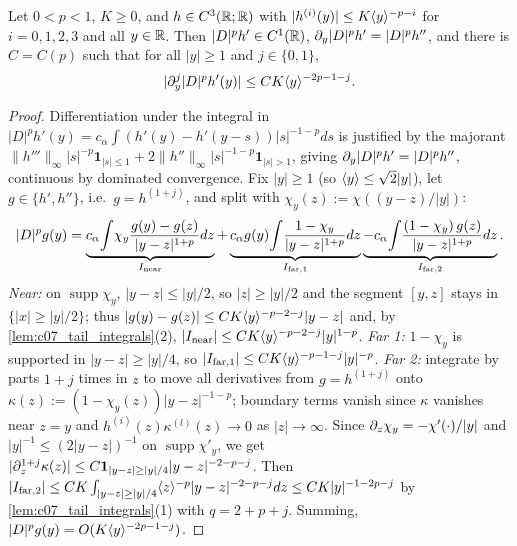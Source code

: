 \begin{lemma}
  \label{lem:c07_fractional_decay}
  Let $0<p<1$, $K\ge0$, and $h\in C^3(\mathbb{R};\mathbb{R})$ with $|h^{(i)}(y)|\le K\langle y \rangle^{-p-i}$ for
  $i=0,1,2,3$ and all $y\in\mathbb{R}$. Then $|D|^ph'\in C^1(\mathbb{R})$, $\partial_y|D|^ph'=|D|^ph''$, and there is
  $C=C(p)$ such that for all $|y|\ge1$ and $j\in\{0,1\}$,
  \[|\partial_y^j|D|^ph'(y)|\le CK\langle y \rangle^{-2p-1-j}.\]
\end{lemma}
\begin{proof}
  Differentiation under the integral in $|D|^ph'(y)=c_\alpha\int(h'(y)-h'(y-s))|s|^{-1-p}ds$ is
  justified by the majorant $\|h'''\|_\infty|s|^{-p}\mathbf 1_{|s|\le1}+2\|h''\|_\infty|s|^{-1-p}\mathbf 1_{|s|>1}$,
  giving $\partial_y|D|^ph'=|D|^ph''$, continuous by dominated convergence. Fix $|y|\ge1$ (so
  $\langle y \rangle\le\sqrt2|y|$), let $g\in\{h',h''\}$, i.e.\ $g=h^{(1+j)}$, and split with
  $\chi_y(z):=\chi((y-z)/|y|)$:
  \[
   |D|^pg(y)=\underbrace{c_\alpha\!\int\!\chi_y\frac{g(y)-g(z)}{|y-z|^{1+p}}dz}_{I_{\rm near}}
   +\underbrace{c_\alpha g(y)\!\int\!\frac{1-\chi_y}{|y-z|^{1+p}}dz}_{I_{\rm far,1}}
   \underbrace{-c_\alpha\!\int\!\frac{(1-\chi_y)\,g(z)}{|y-z|^{1+p}}dz}_{I_{\rm far,2}}.
  \]
  \emph{Near:} on $\operatorname{supp}\chi_y$, $|y-z|\le|y|/2$, so $|z|\geq|y|/2$ and the segment
  $[y,z]$ stays in $\{|x|\ge|y|/2\}$; thus $|g(y)-g(z)|\le CK\langle y \rangle^{-p-2-j}|y-z|$ and, by
  \cref{lem:c07_tail_integrals}(2), $|I_{\rm near}|\le CK\langle y \rangle^{-p-2-j}|y|^{1-p}$.
  \emph{Far 1:} $1-\chi_y$ is supported in $|y-z|\ge|y|/4$, so $|I_{\rm far,1}|\le CK\langle y \rangle^{-p-1-j}|y|^{-p}$.
  \emph{Far 2:} integrate by parts $1+j$ times in $z$ to move all derivatives from $g=h^{(1+j)}$ onto
  $\kappa(z):=(1-\chi_y(z))|y-z|^{-1-p}$; boundary terms vanish since $\kappa$ vanishes near $z=y$
  and $h^{(i)}(z)\kappa^{(l)}(z)\to0$ as $|z|\to\infty$. Since $\partial_z\chi_y=-\chi'(\cdot)/|y|$ and
  $|y|^{-1}\le(2|y-z|)^{-1}$ on $\operatorname{supp}\chi'_y$, we get
  $|\partial_z^{1+j}\kappa(z)|\le C\mathbf 1_{|y-z|\ge|y|/4}|y-z|^{-2-p-j}$. Then
  $|I_{\rm far,2}|\le CK\int_{|y-z|\ge|y|/4}\langle z \rangle^{-p}|y-z|^{-2-p-j}dz\le CK|y|^{-1-2p-j}$ by
  \cref{lem:c07_tail_integrals}(1) with $q=2+p+j$. Summing, $|D|^pg(y)=O(K\langle y \rangle^{-2p-1-j})$.
\end{proof}

